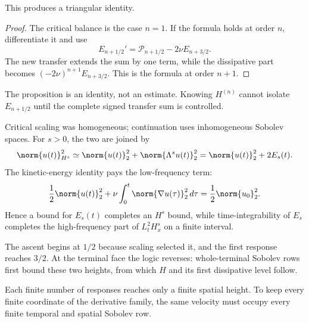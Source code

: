 This produces a triangular identity.
\begin{proof}
The critical balance is the case \(n=1\).  If the formula holds at order
\(n\), differentiate it and use
\[
  E_{n+1/2}'
  =
  \mathcal P_{n+1/2}-2\nu E_{n+3/2}.
\]
The new transfer extends the sum by one term, while the dissipative part becomes
\((-2\nu)^{n+1}E_{n+3/2}\).  This is the formula at order \(n+1\).
\end{proof}
The proposition is an identity, not an estimate.  Knowing \(H^{(n)}\) cannot
isolate \(E_{n+1/2}\) until the complete signed transfer sum is controlled.

Critical scaling was homogeneous; continuation uses inhomogeneous Sobolev
spaces.  For \(s>0\), the two are joined by
\[
  \norm{u(t)}_{H^s}^2
  \simeq
  \norm{u(t)}_2^2+\norm{\Lambda^su(t)}_2^2
  =
  \norm{u(t)}_2^2+2E_s(t).
\]
The kinetic-energy identity pays the low-frequency term:
\[
  \frac12\norm{u(t)}_2^2
  +
  \nu\int_0^t\norm{\nabla u(\tau)}_2^2\,d\tau
  =
  \frac12\norm{u_0}_2^2.
\]
Hence a bound for \(E_s(t)\) completes an \(H^s\) bound, while time-integrability
of \(E_s\) completes the high-frequency part of \(L^2_tH^s_x\) on a finite
interval.

The ascent begins at \(1/2\) because scaling selected it, and the first response
reaches \(3/2\).  At the terminal face the logic reverses: whole-terminal
Sobolev rows first bound these two heights, from which \(H\) and its first
dissipative level follow.

Each finite number of responses reaches only a finite spatial height.  To keep
every finite coordinate of the derivative family, the same velocity must
occupy every finite temporal and spatial Sobolev row.
